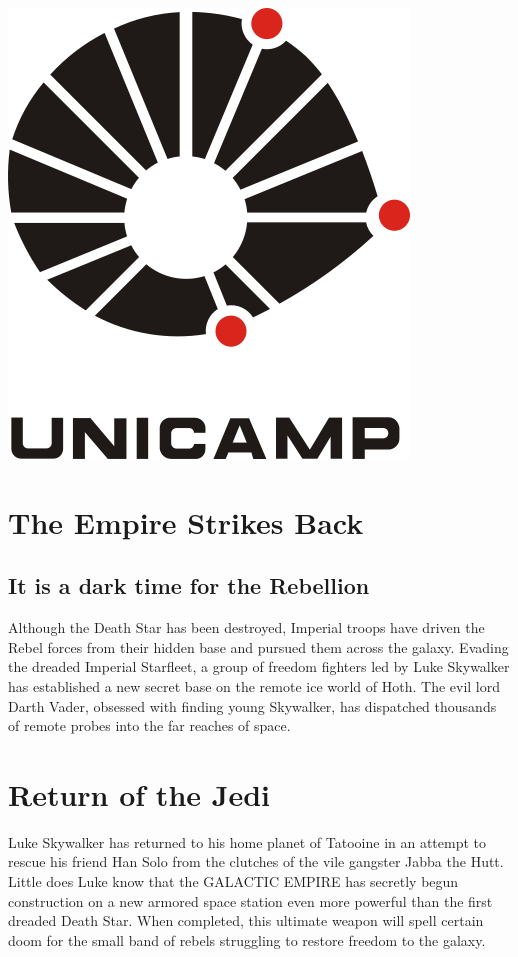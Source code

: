 \documentclass[oneside]{ifgw}
\begin{document}
\begin{center}
\includegraphics[width=.35\textwidth]{Images/unicamp.png}
\end{center}

\lipsum[5-10]

\chapter{The Empire Strikes Back}

\section{It is a dark time for the Rebellion}
 
Although the Death Star has been destroyed, Imperial troops have driven the Rebel forces from their hidden base and pursued them across the galaxy.  Evading the dreaded Imperial Starfleet, a group of freedom fighters led by Luke Skywalker has established a new secret base on the remote ice world of Hoth.  The evil lord Darth Vader, obsessed with finding young Skywalker, has dispatched thousands of remote probes into the far reaches of space.

\lipsum[1-10]

\chapter{Return of the Jedi}

Luke Skywalker has returned to his home planet of Tatooine in an attempt to rescue his friend Han Solo from the clutches of the vile gangster Jabba the Hutt.  Little does Luke know that the GALACTIC EMPIRE has secretly begun construction on a new armored space station even more powerful than the first dreaded Death Star.  When completed, this ultimate weapon will spell certain doom for the small band of rebels struggling to restore freedom to the galaxy.
\end{document}
